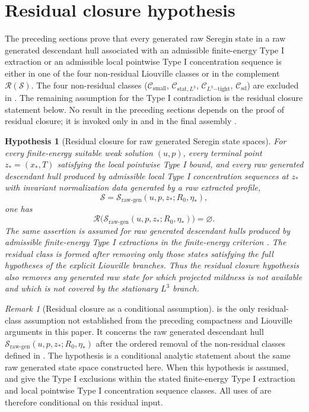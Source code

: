 \documentclass[11pt]{amsart}
\theoremstyle{plain}
\newtheorem{hypothesis}[hypothesis]{Hypothesis}
\theoremstyle{definition}
\theoremstyle{remark}
\newtheorem{remark}[remark]{Remark}
\numberwithin{equation}{section}
\newcommand{\calS}{\mathcal S}
\newcommand{\calR}{\mathcal R}
\newcommand{\calC}{\mathcal C}
\begin{document}
\section{Residual closure hypothesis}\label{p1:sec:criterion}

The preceding sections prove that every generated raw Seregin state in a raw
generated descendant hull associated with an admissible finite-energy Type I
extraction or an admissible local pointwise Type I concentration
sequence is either in one of the four non-residual Liouville classes or in the
complement \(\calR(\calS)\).  The four non-residual classes
(\(\calC_{\mathrm{small}}\), \(\calC_{\mathrm{stat},L^3}\),
\(\calC_{L^3\mathrm{-tight}}\), \(\calC_{\mathrm{sd}}\)) are excluded in
.  The remaining assumption for the Type I
contradiction is the residual closure statement below.  No result in the
preceding sections depends on the proof of residual closure; it is invoked
only in  and in the final assembly
.

\begin{hypothesis}[Residual closure for raw generated Seregin state spaces]
\label{p1:hyp:no-remainder}
For every finite-energy suitable weak solution \((u,p)\), every terminal point
\(z_*=(x_*,T)\) satisfying the local pointwise Type I bound, and every
raw generated descendant hull produced by admissible local Type I concentration
sequences at \(z_*\) with invariant normalization data generated by a raw
extracted profile,
\[
   \calS=\calS_{\mathrm{raw\text{-}gen}}(u,p,z_*;R_0,\eta_*),
\]
one has
\[
   \calR\bigl(\calS_{\mathrm{raw\text{-}gen}}(u,p,z_*;R_0,\eta_*)\bigr)=\varnothing .
\]
The same assertion is assumed for raw generated descendant hulls produced by
admissible finite-energy Type I extractions in the finite-energy criterion
.
The residual class is formed after removing only those states satisfying the
full hypotheses of the explicit Liouville branches.  Thus the residual closure
hypothesis also removes any generated raw state for which projected mildness is
not available and which is not covered by the stationary \(L^3\) branch.
\end{hypothesis}

\begin{remark}[Residual closure as a conditional assumption]
\label{p1:rem:companion-paper}
 is the only residual-class assumption not established
from the preceding compactness and Liouville arguments in this paper.  It concerns
the raw generated descendant hull
\(\calS_{\mathrm{raw\text{-}gen}}(u,p,z_*;R_0,\eta_*)\) after the ordered removal of the
non-residual classes defined in .  The hypothesis is a
conditional analytic statement about the same raw generated state space
constructed here.  When this hypothesis is assumed,
 and
 give the Type I exclusions within the stated
finite-energy Type I extraction and local pointwise Type I concentration
sequence classes.  All uses of
 are therefore conditional on this residual input.
\end{remark}
\end{document}
